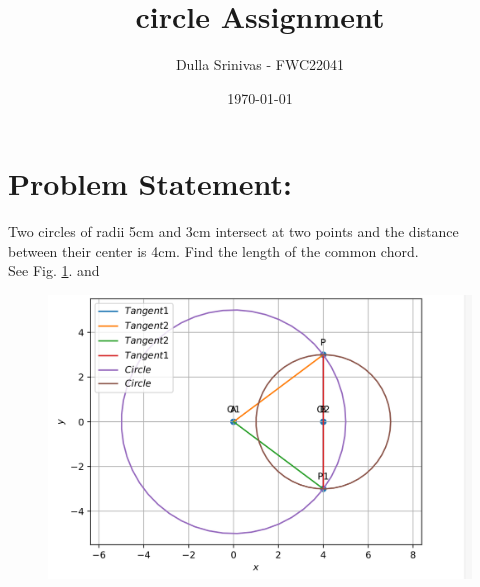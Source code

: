 \documentclass[journal,12pt,twocolumn]{article}
\title{\textbf{circle Assignment}}
\author{Dulla Srinivas - FWC22041}
\date{\today}
\begin{document}
\maketitle
\section*{Problem Statement:}
\fi
Two circles of radii 5cm and 3cm intersect at two points and the distance between their center is 4cm. Find the length of the common chord.
\\
\solution 
See Fig. 
		\ref{fig:9/10/4/1}.
		and
	\begin{figure}[!h]
		\centering
 \includegraphics[width=\columnwidth]{chapters/9/10/4/1/figs/cccc.png}
		\caption{}
		\label{fig:9/10/4/1}
  	\end{figure}
\end{document}
